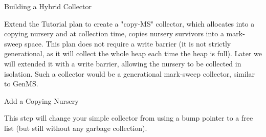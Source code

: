 \begin{section}{Building a Hybrid Collector}
\label{sec:buildingahybridcollector}

Extend the Tutorial plan to create a "copy-MS" collector, which allocates into a copying nursery and at collection time, copies nursery survivors into a mark-sweep space. This plan does not require a write barrier (it is not strictly generational, as it will collect the whole heap each time the heap is full). Later we will extended it with a write barrier, allowing the nursery to be collected in isolation. Such a collector would be a generational mark-sweep collector, similar to GenMS.

\begin{subsection}{Add a Copying Nursery}

This step will change your simple collector from using a bump pointer to a free list (but still without any garbage collection).


\end{subsection}
\end{section}
